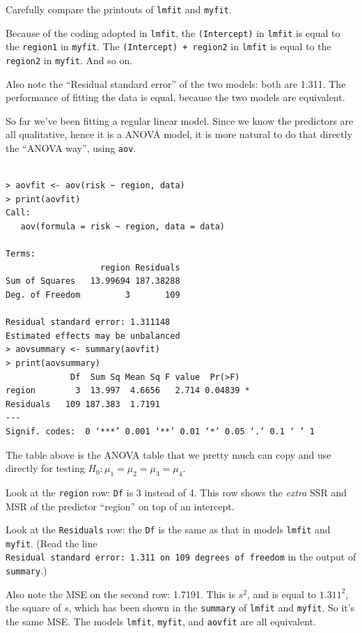 \documentclass[12pt]{article}
\begin{document}
Carefully compare the printouts of \verb+lmfit+ and \verb+myfit+.

Because of the coding adopted in \verb+lmfit+,
the \verb+(Intercept)+ in \verb+lmfit+ is equal to the
\verb+region1+ in \verb+myfit+.
The \verb/(Intercept) + region2/ in \verb+lmfit+
is equal to the \verb+region2+ in \verb+myfit+.
And so on.

Also note the ``Residual standard error'' of the two models:
both are 1.311. The performance of fitting the data is equal,
because the two models are equivalent.

So far we've been fitting a regular linear model.
Since we know the predictors are all qualitative,
hence it is a ANOVA model, it is more natural to do that
directly the ``ANOVA way'', using \verb+aov+.

\begin{verbatim}

> aovfit <- aov(risk ~ region, data)
> print(aovfit)
Call:
   aov(formula = risk ~ region, data = data)

Terms:
                   region Residuals
Sum of Squares   13.99694 187.38288
Deg. of Freedom         3       109

Residual standard error: 1.311148 
Estimated effects may be unbalanced
> aovsummary <- summary(aovfit)
> print(aovsummary)
             Df  Sum Sq Mean Sq F value  Pr(>F)  
region        3  13.997  4.6656   2.714 0.04839 *
Residuals   109 187.383  1.7191                  
---
Signif. codes:  0 ‘***’ 0.001 ‘**’ 0.01 ‘*’ 0.05 ‘.’ 0.1 ‘ ’ 1 
\end{verbatim}

The table above is the ANOVA table that we pretty much
can copy and use directly for testing
$H_0: \mu_1=\mu_2=\mu_3=\mu_4$.

Look at the \verb+region+ row:
\verb+Df+ is 3 instead of 4.
This row shows the \emph{extra} SSR and MSR
of the predictor ``region'' on top
of an intercept.

Look at the \verb+Residuals+ row:
the \verb+Df+ is the same as that
in models \verb+lmfit+ and \verb+myfit+.
(Read the line\\
\verb+Residual standard error: 1.311 on 109 degrees of freedom+
in the output of \verb+summary+.)

Also note the MSE on the second row: 1.7191.
This is $s^2$, and is equal to $1.311^2$,
the square of $s$, which has been shown
in the \verb+summary+ of \verb+lmfit+ and \verb+myfit+.
So it's the same MSE.
The models \verb+lmfit+, \verb+myfit+, and \verb+aovfit+
are all equivalent.
\end{document}

